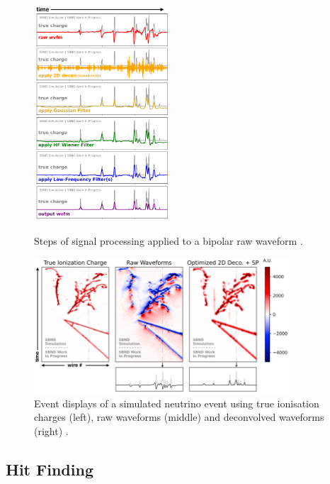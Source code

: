 \begin{figure}[ht!] 
\centering    
\includegraphics[width=0.45\textwidth]{signal_processing_steps}
\caption[Signal Processing Steps]{
Steps of signal processing applied to a bipolar raw waveform \cite{LynnSignal}.
}
\label{fig:signal_processing_steps}
\vspace{0.5cm}
\centering    
\includegraphics[width=0.85\textwidth]{signal_processing_waveform}
\caption[Event Displays of a Neutrino Interaction Before and After Signal Processing]{
Event displays of a simulated neutrino event using true ionisation charges (left), raw waveforms (middle) and deconvolved waveforms (right) \cite{LynnSignal}.
}
\label{fig:signal_processing_waveform}
\end{figure}

\subsection{Hit Finding}
\label{sec:hit_find}

